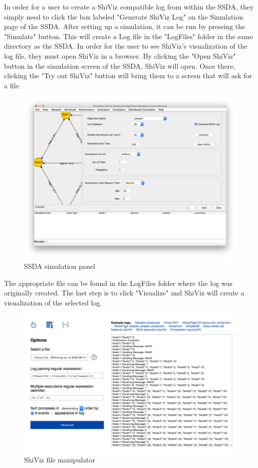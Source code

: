 \documentclass[12pt, oneside]{article}   	%
\begin{document}
In order for a user to create a ShiViz compatible log from within the SSDA, they simply need to click the box labeled "Generate ShiViz Log" on the Simulation page of the SSDA.  After setting up a simulation, it can be run by pressing the "Simulate" button.  This will create a Log file in the "LogFiles" folder in the same directory as the SSDA.  In order for the user to see ShiViz's visualization of the log file, they must open ShiViz in a browser.  By clicking the "Open ShiViz" button in the simulation screen of the SSDA, ShiViz will open.  Once there, clicking the "Try out ShiViz" button will bring them to a screen that will ask for a file.
\begin{figure}[h!]
\caption{SSDA simulation panel}
\includegraphics[scale=0.3]{SSDA_Sim_Window.png} 
\centering
\end{figure}
The appropriate file can be found in the LogFiles folder where the log was originally created.  The last step is to click "Visualize" and ShiViz will create a visualization of the selected log.
\begin{figure}[h!]
\caption{ShiViz file manipulator}
\includegraphics[scale=0.5]{ShiViz_File.png} 
\centering
\end{figure}
\end{document}
